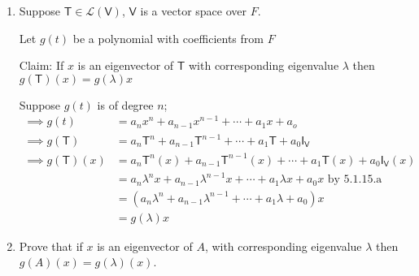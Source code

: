 \begin{enumerate}
\item Suppose $\mathsf{T} \in \mathcal{L}(\mathsf{V})$, $\mathsf{V}$
  is a vector space over $F$.

Let $g(t)$ be a polynomial with coefficients from $F$

Claim: If $x$ is an eigenvector of $\mathsf{T}$ with corresponding
eigenvalue $\lambda$ then $g(\mathsf{T})(x) = g(\lambda)x$

Suppose $g(t)$ is of degree $n$;
\begin{align}
\implies g(t) &= a_nx^n +a_{n-1}x^{n-1} +\dotsb+ a_1x + a_o\\
\implies g(\mathsf{T}) &= a_n\mathsf{T}^n + a_{n-1}\mathsf{T}^{n-1}
+\dotsb + a_1\mathsf{T} +a_0\mathsf{I}_{\mathsf{V}}\\
\implies g(\mathsf{T}) (x)&= a_n\mathsf{T}^n(x) + a_{n-1}\mathsf{T}^{n-1}(x)
+\dotsb + a_1\mathsf{T}(x) +a_0\mathsf{I}_{\mathsf{V}}(x)\\
&=a_n\lambda^nx +a_{n-1}\lambda^{n-1}x +\dotsb +a_1\lambda x+ a_0x
\text{ by 5.1.15.a}\\
&=(a_n\lambda^n +a_{n-1}\lambda^{n-1} +\dotsb +a_1\lambda + a_0)x\\
&=g(\lambda)x
\end{align}
\item Prove that if $x$ is an eigenvector of $A$, with corresponding
  eigenvalue $\lambda$ then $g(A)(x) = g(\lambda)(x)$.


\end{enumerate}
